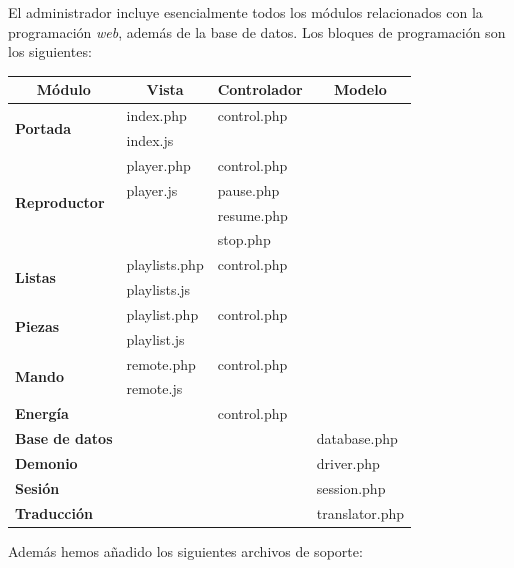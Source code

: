 El administrador incluye esencialmente todos los módulos relacionados con la programación \textit{web}, además de la base de datos. Los bloques de programación son los siguientes:

\smallskip

\begin{center}
	\begin{tabular}{|l|l|l|l|}
		\hline \multicolumn{1}{|c|}{\textbf{Módulo}} & \multicolumn{1}{c|}{\textbf{Vista}} & \multicolumn{1}{c|}{\textbf{Controlador}} & \multicolumn{1}{c|}{\textbf{Modelo}} \\ 
		\hline \multirow{2}{*}{\textbf{Portada}} & index.php & control.php & \\
		& index.js & & \\
		\hline \multirow{4}{*}{\textbf{Reproductor}} & player.php & control.php & \\
		& player.js & pause.php & \\
		& & resume.php & \\
		& & stop.php & \\
		\hline \multirow{2}{*}{\textbf{Listas}} & playlists.php & control.php & \\
		& playlists.js & & \\
		\hline \multirow{2}{*}{\textbf{Piezas}} & playlist.php & control.php & \\
		& playlist.js & & \\
		\hline \multirow{2}{*}{\textbf{Mando}} & remote.php & control.php & \\
		& remote.js & & \\
		\hline \textbf{Energía} & & control.php & \\
		\hline \textbf{Base de datos} & & & database.php \\
		\hline \textbf{Demonio} & & & driver.php \\
		\hline \textbf{Sesión} & & & session.php \\
		\hline \textbf{Traducción} & & & translator.php \\
		\hline 
	\end{tabular}
	\smallskip
\end{center}

\smallskip

Además hemos añadido los siguientes archivos de soporte:

\smallskip

